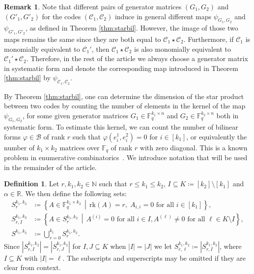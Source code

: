 \documentclass[a4paper,11pt,reqno]{article}
\newcommand{\F}{\mathbb{F}}
\newcommand{\rk}{\mathrm{rk}}
\newcommand{\C}{\mathcal{C}}
\theoremstyle{plain} \numberwithin{equation}{section}
\theoremstyle{definition}
\newtheorem{definition}[theorem]{Definition}
\newtheorem{remark}[theorem]{Remark}
\begin{document}
\begin{remark}
   Note that  different pairs of generator matrices $(G_1, G_2)$ and $(G'_1, G'_2)$ for the codes $(\C_1, \C_2)$ induce in general different maps $\psi_{G_1, G_2}$ and $\psi_{G'_1,G'_2}$, as defined in Theorem \ref{thm:starbil}. However, the image of those two maps remains the same since they are both equal to $\C_1 \star\C_2$. Furthermore, if $\C_1$ is monomially equivalent to $\C_1'$, then $\C_1 \star \C_2$ is also monomially equivalent to $\C_1'\star \C_2$. Therefore, in the rest of the article we always choose a generator matrix in systematic form and denote the corresponding map introduced in Theorem \ref{thm:starbil} by $\psi_{\C_1, \C_2}$.
\end{remark}


By Theorem \ref{thm:starbil}, one can determine the dimension of the star product between two codes by counting the number of elements in the kernel of the map $\psi_{G_1, G_2}$, for some given generator matrices $G_1 \in \F_q^{k_1 \times n}$ and $ G_2 \in \F_q^{k_2 \times n}$ both in systematic form. To estimate this kernel, we can count the number of bilinear forms $\varphi\in \mathcal{B}$ of rank $r$ such that $\varphi(e_i^1,e_i^2)=0$ for $i\in [k_1]$, or equivalently the number of $k_1\times k_2$ matrices over $\F_q$ of rank $r$ with zero diagonal. This is a known problem in enumerative combinatorics~\cite{lewis2011matrices,ravagnani2018duality}.
We introduce notation that
will be used in the remainder of the article. 

\begin{definition}\label{not2}
Let $r,k_1,k_2 \in \mathbb{N}$ such that $r\leq k_1\leq k_2$, $I\subseteq K \coloneqq  [k_2]\setminus [k_1]$ and $\alpha\in \mathbb{R}$. We then define the following sets:
\begin{align*}
 S_r^{k_1,k_2} &\coloneqq \left\{A\in \F_q^{k_1\times k_2} \,\middle|\, \rk(A) = r, \; A_{i,i}=0 \text{ for all } i\in [k_1] \right\}, \\
    S_{r,I}^{k_1,k_2} &\coloneqq \left\{A \in S_{r}^{k_1,k_2}\, \middle|\, A^{(i)}=0\text{ for all } i\in I, A^{(\ell)}\neq 0\text{ for all } \ell\in K\setminus I \right\},\\
    S^{k_1,k_2} &\coloneqq \bigcup_{r=0}^{k_1}S_r^{k_1,k_2}.
\end{align*}
Since $|S_{r,I}^{k_1,k_2}| = |S_{r,J}^{k_1,k_2}|$ for $I,J\subseteq K$ when $|I|=|J|$ we let $S_{r,\ell}^{k_1,k_2} \coloneqq |S_{r,I}^{k_1,k_2}|$, where $I\subseteq K$ with $|I|=\ell$. The subscripts and superscripts may be omitted if they are clear from context.
\end{definition}
\end{document}
